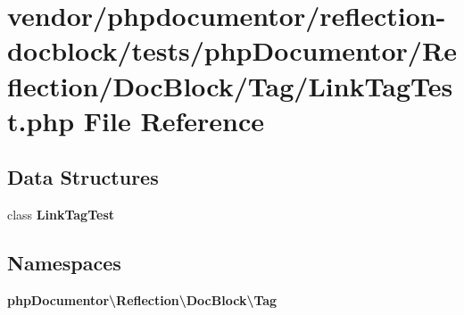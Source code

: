 \section{vendor/phpdocumentor/reflection-\/docblock/tests/php\+Documentor/\+Reflection/\+Doc\+Block/\+Tag/\+Link\+Tag\+Test.php File Reference}
\label{_link_tag_test_8php}
\subsection*{Data Structures}
\begin{DoxyCompactItemize}
\item 
class {\bf Link\+Tag\+Test}
\end{DoxyCompactItemize}
\subsection*{Namespaces}
\begin{DoxyCompactItemize}
\item 
 {\bf php\+Documentor\textbackslash{}\+Reflection\textbackslash{}\+Doc\+Block\textbackslash{}\+Tag}
\end{DoxyCompactItemize}
